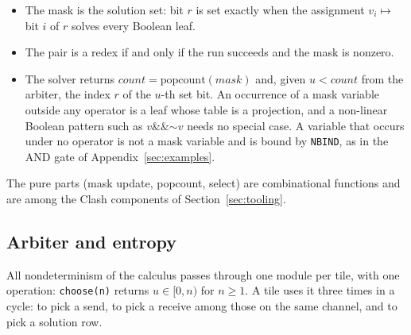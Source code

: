 \documentclass[11pt]{article}
\newcommand{\kw}[1]{\texttt{#1}}
\newcommand{\bnot}{\mathord{\sim}}
\newcommand{\band}{\mathbin{\&\&}}
\theoremstyle{definition}
\theoremstyle{remark}
\begin{document}
\begin{itemize}
\item The mask is the solution set: bit $r$ is set exactly when the
assignment $v_i \mapsto$ bit $i$ of $r$ solves every Boolean leaf.
\item The pair is a redex if and only if the run succeeds and the mask is
nonzero.
\item The solver returns $\mathit{count} = \mathrm{popcount}(\mathit{mask})$
and, given $u < \mathit{count}$ from the arbiter, the index $r$ of the
$u$-th set bit. An occurrence of a mask variable outside any operator is a leaf whose table
is a projection, and a non-linear Boolean pattern such as
$v \band \bnot v$ needs no special case. A variable that occurs under no
operator is not a mask variable and is bound by \kw{NBIND}, as in the AND gate
of Appendix~\ref{sec:examples}.
\end{itemize}
The pure parts (mask update, popcount, select) are combinational functions
and are among the Clash components of Section~\ref{sec:tooling}.

\subsection{Arbiter and entropy}\label{sec:arbiter}

All nondeterminism of the calculus passes through one module per tile, with
one operation: \kw{choose(n)} returns $u \in [0,n)$ for $n \ge 1$. A tile
uses it three times in a cycle: to pick a send, to pick a receive among those
on the same channel, and to pick a solution row.
\end{document}
